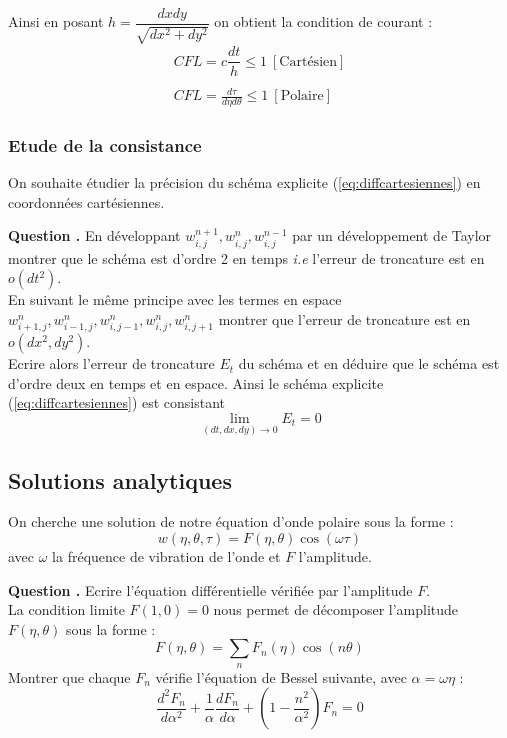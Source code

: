 \documentclass[a4,12pt]{article}
\newcounter{Nbquestion}
\newcommand*\question{%
\stepcounter{Nbquestion}%
\textbf{Question \theNbquestion. }}
\begin{document}

Ainsi en posant $\displaystyle h=\dfrac{dxdy}{\sqrt{dx^2+dy^2}}$ on obtient la condition de courant : 
\begin{equation}
	\begin{array}{l}
		CFL=c\dfrac{dt}{h} \leq 1~[\textrm{Cartésien}] \\ \\
		\displaystyle CFL=\frac{d \tau}{d \eta d \theta}\leq 1~[\textrm{Polaire}]
	\end{array}
	\label{eq:CFL}
\end{equation}

\subsubsection{Etude de la consistance}
On souhaite étudier la précision du schéma explicite (\ref{eq:diffcartesiennes}) en coordonnées cartésiennes.


\begin{mdframed}[style=exampledefault]
\question En développant $w_{i,j}^{n+1},w_{i,j}^{n},w_{i,j}^{n-1}$ par un développement de Taylor montrer que le schéma est d'ordre 2 en temps \textit{i.e} l'erreur de troncature est en $o(dt^2)$.\\
En suivant le même principe avec les termes en espace $w_{i+1,j}^{n},w_{i-1,j}^{n},w_{i,j-1}^{n},w_{i,j}^{n},w_{i,j+1}^{n}$ montrer que l'erreur de troncature est en $o (dx^2,dy^2)$.\\
Ecrire alors l'erreur de troncature $E_t$ du schéma et en déduire que le schéma est d'ordre deux en temps et en espace. Ainsi le schéma explicite (\ref{eq:diffcartesiennes}) est consistant 
\[
\lim_{(dt,dx,dy)\longrightarrow 0} E_t=0
\]
\end{mdframed}


\subsection{Solutions analytiques }
On cherche une solution de notre équation d'onde polaire sous la forme :
\[
w(\eta,\theta,\tau)=F(\eta,\theta)\cos(\omega \tau)
\]
avec $\omega$ la fréquence de vibration de l'onde et $F$ l'amplitude.


\begin{mdframed}[style=exampledefault]
\question Ecrire l'équation différentielle vérifiée par l'amplitude $F$.\\

La condition limite $F(1,0)=0$ nous permet de décomposer l'amplitude $F(\eta,\theta)$ sous la forme :
\[
F(\eta,\theta)=\sum_n F_n(\eta)\cos(n\theta)
\]
Montrer que chaque $F_n$ vérifie l'équation de Bessel suivante, avec  $\alpha=\omega\eta$ :
\[
\frac{d^2 F_n}{d\alpha^2}+\frac{1}{\alpha}\frac{dF_n}{d\alpha}+\left(1-\frac{n^2}{\alpha^2}\right)F_n=0
\]
\end{mdframed}
\end{document}
